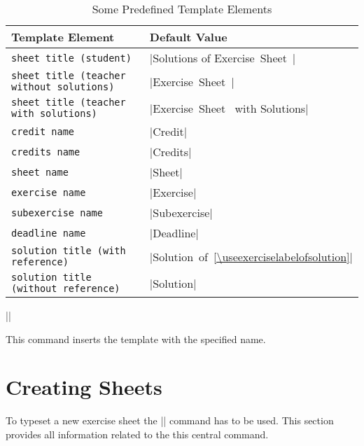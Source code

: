 \documentclass[a4paper,fleqn]{report}
\def\sheettemplatekey#1{\lstinline[language={}]{#1}}
\def\syntaxdefaultarg#1{\hfill\texttt{\small #1}\par\smallskip\noindent\ignorespaces}
\def\metaargument#1{\textit{\small #1}}
\begin{document}
\begin{table}[htbp]
  \caption{Some Predefined Template Elements}
  \label{table:template elements}
  \centering
  \bigskip
  \begin{tabular}{lp{}}
    Template Element & Default Value \\ \midrule
    \sheettemplatekey{sheet title (student)} & 
      |Solutions of Exercise~Sheet~\thesheet{}| \\
    \sheettemplatekey{sheet title (teacher without solutions)} & 
      |Exercise~Sheet~\thesheet{}| \\
    \sheettemplatekey{sheet title (teacher with solutions)} & 
      |Exercise~Sheet~\thesheet{} with Solutions| \\
    \sheettemplatekey{credit name} & 
      |Credit| \\
    \sheettemplatekey{credits name} & 
      |Credits| \\
    \sheettemplatekey{sheet name} & 
      |Sheet| \\
    \sheettemplatekey{exercise name} & 
      |Exercise| \\
    \sheettemplatekey{subexercise name} & 
      |Subexercise| \\
    \sheettemplatekey{deadline name} & 
      |Deadline| \\
    \sheettemplatekey{solution title (with reference)} &
      |Solution~of~\ref{\useexerciselabelofsolution}| \\
    \sheettemplatekey{solution title (without reference)} & 
      |Solution| \\
  \end{tabular}
\end{table}

\begin{syntax}
  |\usesheettemplate{|\metaargument{template name}|}|
  \syntaxdefaultarg{}
  This command inserts the template with the specified name.
\end{syntax}

\section{Creating Sheets}

To typeset a new exercise sheet the |\sheet| command has to be used.
This section provides all information related to the this central
command.
\end{document}
